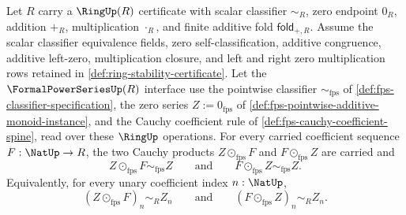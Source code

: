 \begin{theorem}
\label{thm:fps-zero-series-cauchy-product-absorption-over-ringup-scalars}
Let $R$ carry a $\RingUp(R)$ certificate with scalar classifier $\sim_R$, zero endpoint $0_R$, addition $+_R$, multiplication $\cdot_R$, and finite additive fold $\mathsf{fold}_{+,R}$. Assume the scalar classifier equivalence fields, zero self-classification, additive congruence, additive left-zero, multiplication closure, and left and right zero multiplication rows retained in \autoref{def:ring-stability-certificate}. Let the $\FormalPowerSeriesUp(R)$ interface use the pointwise classifier $\sim_{\mathrm{fps}}$ of \autoref{def:fps-classifier-specification}, the zero series $Z:=0_{\mathrm{fps}}$ of \autoref{def:fps-pointwise-additive-monoid-instance}, and the Cauchy coefficient rule of \autoref{def:fps-cauchy-coefficient-spine}, read over these $\RingUp$ operations. For every carried coefficient sequence $F:\NatUp\to R$, the two Cauchy products $Z\odot_{\mathrm{fps}}F$ and $F\odot_{\mathrm{fps}}Z$ are carried and
$$
Z\odot_{\mathrm{fps}}F\sim_{\mathrm{fps}}Z
\qquad\text{and}\qquad
F\odot_{\mathrm{fps}}Z\sim_{\mathrm{fps}}Z.
$$
Equivalently, for every unary coefficient index $n:\NatUp$,
$$
(Z\odot_{\mathrm{fps}}F)_n\sim_R Z_n
\qquad\text{and}\qquad
(F\odot_{\mathrm{fps}}Z)_n\sim_R Z_n.
$$
\end{theorem}
